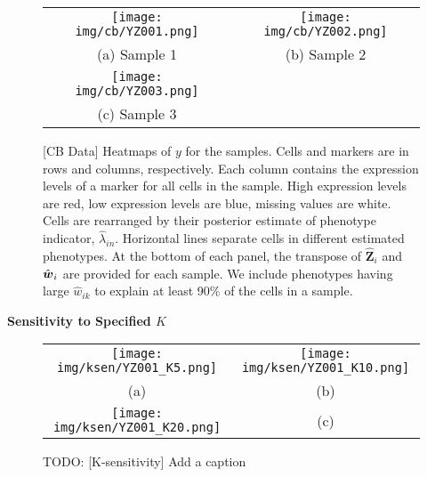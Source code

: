 \documentclass[12pt,]{article}
\def\Z{\bm{Z}}
\newcommand{\bw}{\mbox{\boldmath $w$}}
\begin{document}
\begin{figure}%
\begin{center}
  \begin{tabular}{cc}
  \texttt{[image: img/cb/YZ001.png]}&
  \texttt{[image: img/cb/YZ002.png]}\\
  (a) Sample 1 & (b) Sample 2 \\
  \texttt{[image: img/cb/YZ003.png]} &\\
  (c) Sample 3 & \\
  \end{tabular}
\end{center}
\vspace{-0.05in}
\caption{[CB Data]  Heatmaps of $y$ for the samples. Cells and markers are in
rows and columns, respectively. Each column contains the expression levels of
a marker for all cells in the sample. High expression levels are red, low
expression levels are blue, missing values are white.   Cells are rearranged
by their posterior estimate of phenotype indicator, $\hat{\lambda}_{in}$.
Horizontal lines separate cells in different estimated phenotypes.
At the bottom of each panel, the transpose of $\hat{\Z}_i$
and $\hat{\bw}_i$ are provided for each sample. We include phenotypes having
large $\hat{w}_{ik}$ to explain at least 90\% of the cells in a sample.}
\label{fig:cb-post-Z}
\end{figure}

\textbf{Sensitivity to Specified $K$}
\begin{figure}%
\begin{center}
  \begin{tabular}{cc}
  \texttt{[image: img/ksen/YZ001\_K5.png]}&
  \texttt{[image: img/ksen/YZ001\_K10.png]}\\
  {\small (a)} & {\small (b)} \\
  \texttt{[image: img/ksen/YZ001\_K20.png]}&
  {\small (c)} \\
  \end{tabular}
\end{center}
\vspace{-0.05in}
\caption{TODO: [K-sensitivity] Add a caption}
\label{fig:ksen-post-Z}
\end{figure}


\end{document}
